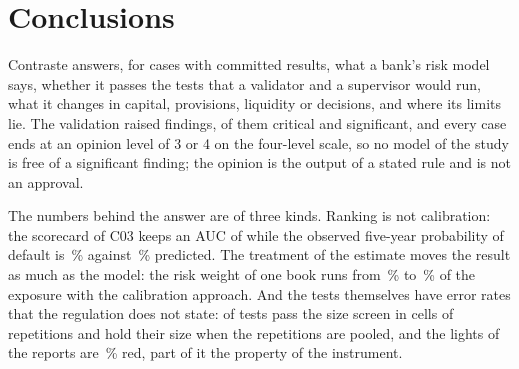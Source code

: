 \section{Conclusions}
\label{sec:conclusions}

Contraste answers, for \rsCasesResult{} cases with committed results, what a bank's risk model says, whether it passes the tests that a validator and a supervisor would run, what it changes in capital, provisions, liquidity or decisions, and where its limits lie. The validation raised \rsFindTotal{} findings, \rsFindSOne{} of them critical and \rsFindSTwo{} significant, and every case ends at an opinion level of 3 or 4 on the four-level scale, so no model of the study is free of a significant finding; the opinion is the output of a stated rule and is not an approval.

The numbers behind the answer are of three kinds. Ranking is not calibration: the scorecard of C03 keeps an AUC of \rsCThreeAuc{} while the observed five-year probability of default is \rsCThreeObs{}\,\% against \rsCThreePred{}\,\% predicted. The treatment of the estimate moves the result as much as the model: the risk weight of one book runs from \rsCFiveRwMin{}\,\% to \rsCFiveRwMax{}\,\% of the exposure with the calibration approach. And the tests themselves have error rates that the regulation does not state: \rsCTwentyTwoWithin{} of \pxOneTests{} tests pass the size screen in cells of \rsCTwentyTwoNullPerTest{} repetitions and \pxPpOneHold{} hold their size when the repetitions are pooled, and the lights of the \rsReports{} reports are \rsLightsRedShare{}\,\% red, part of it the property of the instrument.

